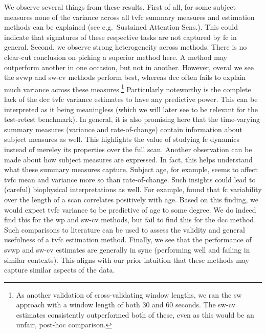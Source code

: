 We observe several things from these results.
%
First of all, for some subject measures none of the variance across all \gls{tvfc} summary measures and estimation methods can be explained (see e.g.~Sustained Attention Sens.).
This could indicate that signatures of these respective tasks are not captured by \gls{fc} in general.
%
Second, we observe strong heterogeneity across methods.
There is no clear-cut conclusion on picking a superior method here.
A method may outperform another in one occasion, but not in another.
However, overal we see the \gls{svwp} and \gls{sw-cv} methods perform best, whereas \gls{dcc} often fails to explain much variance across these measures.\footnote{As another validation of cross-validating window lengths, we ran the \gls{sw} approach with a window length of both 30 and 60 seconds. The \gls{sw-cv} estimates consistently outperformed both of these, even as this would be an unfair, post-hoc comparison.}
Particularly noteworthy is the complete lack of the \gls{dcc} \gls{tvfc} variance estimates to have any predictive power.
This can be interpreted as it being meaningless (which we will later see to be relevant for the test-retest benchmark).
%
In general, it is also promising here that the time-varying summary measures (variance and rate-of-change) contain information about subject measures as well.
This highlights the value of studying \gls{fc} dynamics instead of mereley its properties over the full scan.
%
Another observation can be made about how subject measures are expressed.
In fact, this helps understand what these summary measures capture.
Subject age, for example, seems to affect \gls{tvfc} mean and variance more so than rate-of-change.
Such insights could lead to (careful) biophysical interpretations as well.
For example, \textcite{Hutchison2015} found that \gls{fc} variability over the length of a scan correlates positively with age.
Based on this finding, we would expect \gls{tvfc} variance to be predictive of age to some degree.
We do indeed find this for the \gls{wp} and \gls{sw-cv} methods, but fail to find this for the \gls{dcc} method.
Such comparisons to literature can be used to assess the validity and general usefulness of a \gls{tvfc} estimation method.
%
Finally, we see that the performance of \gls{svwp} and \gls{sw-cv} estimates are generally in sync (performing well and failing in similar contexts).
This aligns with our prior intuition that these methods may capture similar aspects of the data.



